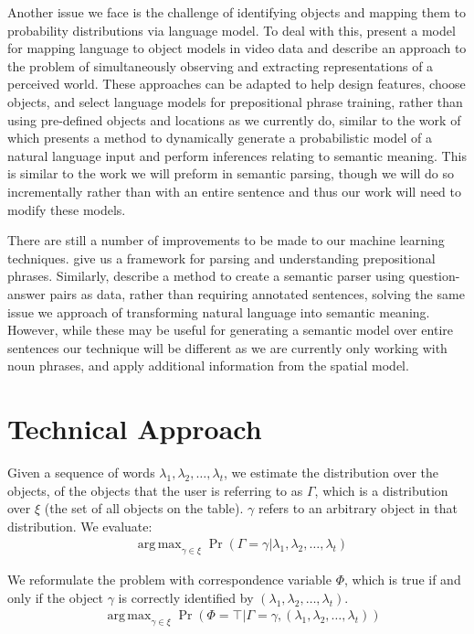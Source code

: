 \documentclass[conference]{IEEEtran}
\numberwithin{equation}{section}
\DeclareMathOperator*{\argmax}{arg\,max}
\begin{document}
Another issue we face is the challenge of identifying objects and mapping them to probability distributions via language model. To deal with this, \citet{barbu13} present a model for mapping language to object models in video data and \citet{UW_RSE_ICML2012} describe an approach to the problem of simultaneously observing and extracting representations of a perceived world. These approaches can be adapted to help design features, choose objects, and select language models for prepositional phrase training, rather than using pre-defined objects and locations as we currently do, similar to the work of \citet{tellex2011understanding} which presents a method to dynamically generate a probabilistic model of a natural language input and perform inferences relating to semantic meaning. This is similar to the work we will preform in semantic parsing, though we will do so incrementally rather than with an entire sentence and thus our work will need to modify these models.

There are still a number of improvements to be made to our machine learning techniques. \citet{rudzicz03} give us a framework for parsing and understanding prepositional phrases. Similarly, \citet{liang2013learning} describe a method to create a semantic parser using question-answer pairs as data, rather than requiring annotated sentences, solving the same issue we approach of transforming natural language into semantic meaning. However, while these may be useful for generating a semantic model over entire sentences our technique will be different as we are currently only working with noun phrases, and apply additional information from the spatial model. 


\section{Technical Approach}
\newcommand{\true}{\top}
\newcommand{\false}{\bot}
Given a sequence of words $\lambda_1, \lambda_2, \ldots, \lambda_t$, we estimate the distribution over the objects, of the objects that the user is referring to as $\Gamma$, which is a distribution over $\xi$ (the set of all objects on the table). $\gamma$ refers to an arbitrary object in that distribution. We evaluate:
\begin{align}
	& \argmax_{\gamma \in \xi} \Pr(\Gamma = \gamma | \lambda_1, \lambda_2, \ldots, \lambda_t) \
\end{align}

We reformulate the problem with correspondence variable $\Phi$, which is true if and only if the object $\gamma$ is correctly identified by $(\lambda_1, \lambda_2, \ldots, \lambda_t)$.  \citep{tellex2011understanding}
\begin{align}
	& \argmax_{\gamma \in \xi} \Pr(\Phi = \true | \Gamma = \gamma, (\lambda_1, \lambda_2, \ldots, \lambda_t))
\end{align}
\end{document}
